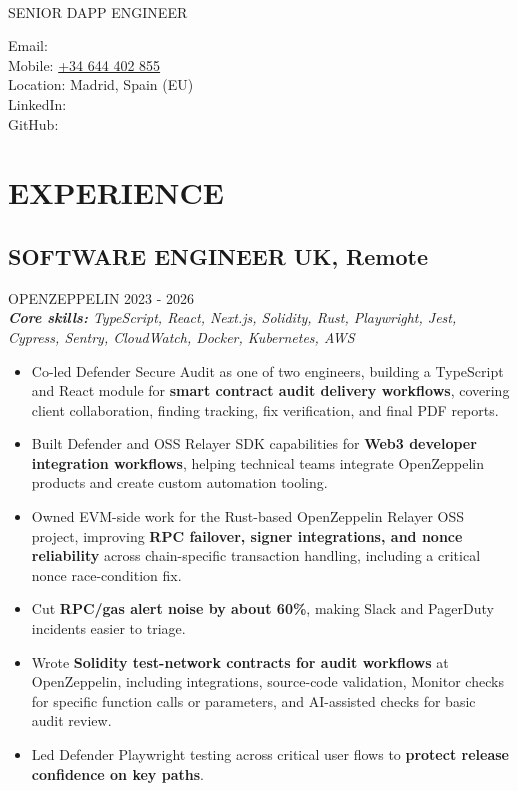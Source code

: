 \documentclass{article}
\newcommand{\WorkExperience}[2]{
   \subsection*{#1}
   \vspace{-1em}
   \uppercase{#2}
}
\newcommand{\Skills}[1]{
   \textit{\textbf{Core skills:} #1}
}
\begin{document}
\begin{center}
	\begin{minipage}{0.5\textwidth}
		{\fontsize{24}{28}\Title{}} \\
		\bigskip
		{\normalsize \MakeUppercase{Senior dApp Engineer}}
	\end{minipage} \hfill
	\begin{minipage}{0.4\textwidth}
		\raggedleft{}
		Email: \href{mailto:\ResumeEmail}{\ResumeEmail} \\
		Mobile: \href{tel:+34644402855}{+34 644 402 855}  \\
		Location: Madrid, Spain (EU) \\
		LinkedIn: \href{\ResumeLinkedInUrl}{\ResumeLinkedInLabel} \\
		GitHub: \href{\ResumeGitHubUrl}{\ResumeGitHubLabel}
	\end{minipage}
\end{center}

\vspace{-3em}

\phantom{Amazon, Microsoft, Facebook} %

\section*{EXPERIENCE}
\WorkExperience{SOFTWARE ENGINEER \hfill UK, Remote}{OpenZeppelin \hfill 2023 {-} 2026} \\
\Skills{TypeScript, React, Next.js, Solidity, Rust, Playwright, Jest, Cypress, Sentry, CloudWatch, Docker, Kubernetes, AWS}
\begin{itemize}
	\item Co-led Defender Secure Audit as one of two engineers, building a TypeScript and React module for \textbf{smart contract audit delivery workflows}, covering client collaboration, finding tracking, fix verification, and final PDF reports.
	\item Built Defender and OSS Relayer SDK capabilities for \textbf{Web3 developer integration workflows}, helping technical teams integrate OpenZeppelin products and create custom automation tooling.
	\item Owned EVM-side work for the Rust-based OpenZeppelin Relayer OSS project, improving \textbf{RPC failover, signer integrations, and nonce reliability} across chain-specific transaction handling, including a critical nonce race-condition fix.
	\item Cut \textbf{RPC/gas alert noise by about 60\%}, making Slack and PagerDuty incidents easier to triage.
	\item Wrote \textbf{Solidity test-network contracts for audit workflows} at OpenZeppelin, including integrations, source-code validation, Monitor checks for specific function calls or parameters, and AI-assisted checks for basic audit review.
	\item Led Defender Playwright testing across critical user flows to \textbf{protect release confidence on key paths}.
\end{itemize}
\end{document}
